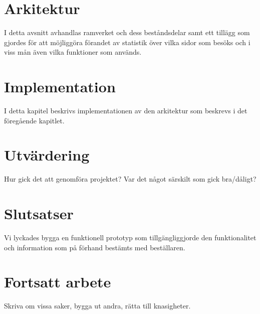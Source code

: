 \documentclass[12pt,a4paper]{report}
\begin{document}



\chapter{Arkitektur}
I detta avsnitt avhandlas ramverket och dess beståndsdelar samt ett
tillägg som gjordes för att möjliggöra förandet av statistik över vilka
sidor som besöks och i viss mån även vilka funktioner som används.



\chapter{Implementation}
I detta kapitel beskrivs implementationen av den arkitektur som beskrevs
i det föregående kapitlet.






\chapter{Utvärdering}
Hur gick det att genomföra projektet? Var det något särskilt som gick
bra/dåligt?




\chapter{Slutsatser}
Vi lyckades bygga en funktionell prototyp som tillgängliggjorde den
funktionalitet och information som på förhand bestämts med beställaren.




\chapter{Fortsatt arbete}
Skriva om vissa saker, bygga ut andra, rätta till knasigheter.

\end{document}
